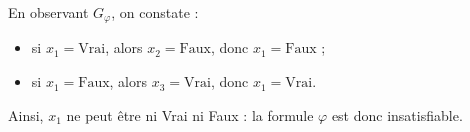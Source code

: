 \begin{corrections}
\begin{questions}
\begin{center}
\begin{tikzpicture}[x=20mm, y=10mm]
        \end{tikzpicture}
    \end{center}

    
  \item En observant $G_\varphi$, on constate :
    \begin{itemize}
      \item si $x_1 = \text{Vrai}$, alors $x_2 = \text{Faux}$, donc $x_1 = \text{Faux}$ ;
      \item si $x_1 = \text{Faux}$, alors $x_3 = \text{Vrai}$, donc $x_1 = \text{Vrai}$.
    \end{itemize}
    Ainsi, $x_1$ ne peut être ni Vrai ni Faux : la formule $\varphi$ est donc insatisfiable.
  
  \end{questions}
\end{corrections}

\endgroup
\endinput
